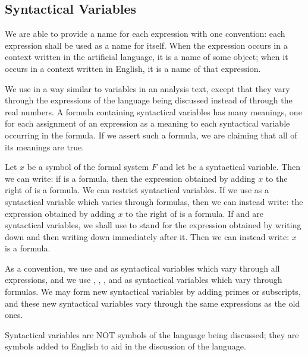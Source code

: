 \subsection{Syntactical Variables}

We are able to provide a name for each expression with one convention: each expression shall be used as a name for itself.
When the expression occurs in a context written in the artificial language, it is a name of some object;
when it occurs in a context written in English, it is a name of that expression.


We use  in a way similar to variables in an analysis text, except that they vary through the expressions of the language being discussed instead of through the real numbers.
A formula containing syntactical variables has many meanings, one for each assignment of an expression as a meaning to each syntactical variable occurring in the formula.
If we assert such a formula, we are claiming that all of its meanings are true.

\begin{example}
Let $x$ be a symbol of the formal system $F$ and let \bu{} be a syntactical variable.
Then we can write: if \bu{} is a formula, then the expression obtained by adding $x$ to the right of \bu{} is a formula.
We can restrict syntactical variables.
If we use \A{} as a syntactical variable which varies through formulas, then we can instead write: the expression obtained by adding $x$ to the right of \A{} is a formula.
If \bu{} and \bv{} are syntactical variables, we shall use \bu{}\bv{} to stand for the expression obtained by writing down \bu{} and then writing down \bv{} immediately after it.
Then we can instead write: \A{}$x$ is a formula.
\end{example}

As a convention, we use \bu{} and \bv{} as syntactical variables which vary through all expressions, and we use \A{}, \B{}, \C{}, and \D{} as syntactical variables which vary through formulas.
We may form new syntactical variables by adding primes or subscripts, and these new syntactical variables vary through the same expressions as the old ones.

\begin{remark}
    Syntactical variables are NOT symbols of the language being discussed;
    they are symbols added to English to aid in the discussion of the language.
\end{remark}
